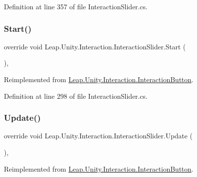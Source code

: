 Definition at line 357 of file Interaction\+Slider.\+cs.

\mbox{\label{class_leap_1_1_unity_1_1_interaction_1_1_interaction_slider_a7a15aed4a6f46dcf1b37ced85386b33b}} 
\subsubsection{\texorpdfstring{Start()}{Start()}}
{\footnotesize\ttfamily override void Leap.\+Unity.\+Interaction.\+Interaction\+Slider.\+Start (\begin{DoxyParamCaption}{ }\end{DoxyParamCaption})\hspace{0.3cm}{\ttfamily [protected]}, {\ttfamily [virtual]}}



Reimplemented from \mbox{\hyperlink{class_leap_1_1_unity_1_1_interaction_1_1_interaction_button_a24a0efb036a0b9ac108e9bf1d5b9fb62}{Leap.\+Unity.\+Interaction.\+Interaction\+Button}}.



Definition at line 298 of file Interaction\+Slider.\+cs.

\mbox{\label{class_leap_1_1_unity_1_1_interaction_1_1_interaction_slider_af07f856388385d64cdd47e6c917308a8}} 
\subsubsection{\texorpdfstring{Update()}{Update()}}
{\footnotesize\ttfamily override void Leap.\+Unity.\+Interaction.\+Interaction\+Slider.\+Update (\begin{DoxyParamCaption}{ }\end{DoxyParamCaption})\hspace{0.3cm}{\ttfamily [protected]}, {\ttfamily [virtual]}}



Reimplemented from \mbox{\hyperlink{class_leap_1_1_unity_1_1_interaction_1_1_interaction_button_a9bd38d8e028c7e13684ed763e3e2830c}{Leap.\+Unity.\+Interaction.\+Interaction\+Button}}.



